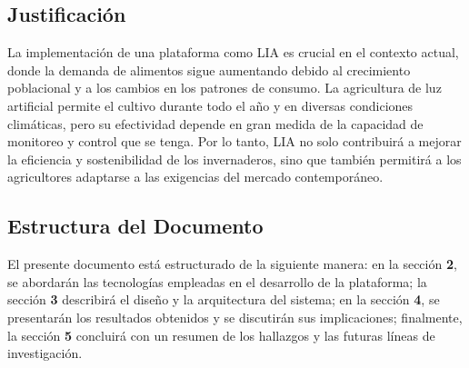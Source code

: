 \subsection{Justificación}
La implementación de una plataforma como LIA es crucial en el contexto actual, donde la demanda de alimentos sigue aumentando debido al crecimiento poblacional y a los cambios en los patrones de consumo. La agricultura de luz artificial permite el cultivo durante todo el año y en diversas condiciones climáticas, pero su efectividad depende en gran medida de la capacidad de monitoreo y control que se tenga. Por lo tanto, LIA no solo contribuirá a mejorar la eficiencia y sostenibilidad de los invernaderos, sino que también permitirá a los agricultores adaptarse a las exigencias del mercado contemporáneo.

\subsection{Estructura del Documento}
El presente documento está estructurado de la siguiente manera: en la sección \textbf{2}, se abordarán las tecnologías empleadas en el desarrollo de la plataforma; la sección \textbf{3} describirá el diseño y la arquitectura del sistema; en la sección \textbf{4}, se presentarán los resultados obtenidos y se discutirán sus implicaciones; finalmente, la sección \textbf{5} concluirá con un resumen de los hallazgos y las futuras líneas de investigación.